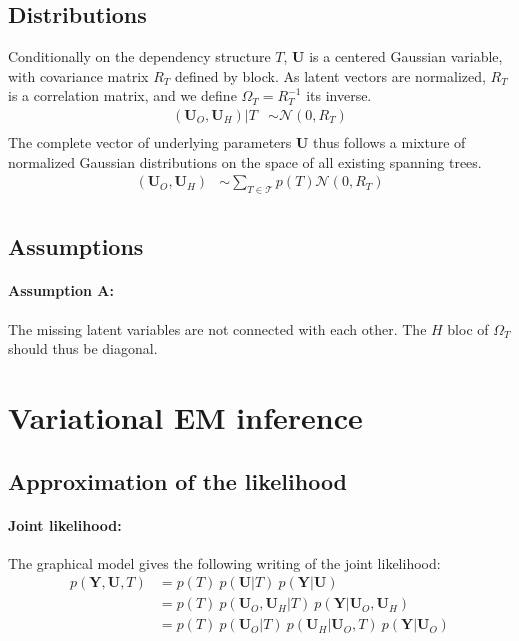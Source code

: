 \documentclass[11pt,a4paper]{article}
\newcommand{\Ybf}{\boldsymbol{Y}}
\newcommand{\Ubf}{\boldsymbol{U}}
\begin{document}
\subsection{Distributions}
\label{distrib}
 Conditionally on the dependency structure $T$, $\Ubf$ is a centered Gaussian variable, with covariance matrix $R_T$ defined by block. As latent vectors are normalized, $R_T$ is a correlation matrix, and we define $\Omega_T=R_T^{-1}$ its inverse.  
\begin{align*}
(\Ubf_O,\Ubf_H)|T & \sim\mathcal{N}(0,R_T)\\
\end{align*}
The complete vector of underlying parameters $\Ubf$ thus follows a mixture of normalized Gaussian distributions on the space of all existing spanning trees.
\begin{align*}
(\Ubf_O,\Ubf_H) &\sim \sum_{T \in \mathcal{T}} p(T) \mathcal{N}(0,R_T) \\
\end{align*}

 

 
 

\subsection{Assumptions}
\paragraph{Assumption A:} The missing latent variables are not connected with each other. The $H$ bloc of $\Omega_T$ should thus be diagonal.
 
 
 \section{Variational EM inference}
\subsection{Approximation of the likelihood}
\paragraph{Joint likelihood:}
The graphical model gives the following writing of the joint likelihood:
\begin{align*}
p(\Ybf,\Ubf,T)& = p(T) \: p(\Ubf|T) \: p(\Ybf|\Ubf) \\
&= p(T)\: p(\Ubf_O,\Ubf_H|T) \: p(\Ybf|\Ubf_O,\Ubf_H) \\
&= p(T) \: p(\Ubf_O|T) \: p(\Ubf_H | \Ubf_O,T)  \: p(\Ybf|\Ubf_O)
\end{align*} 
\end{document}
